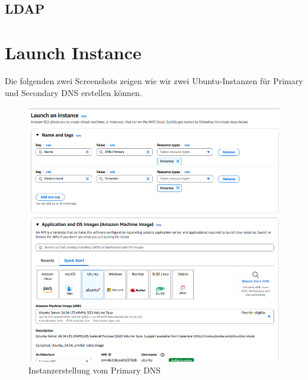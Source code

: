 \documentclass[a4paper,12pt]{article}
\begin{document}
\subsection{LDAP}
\begin{table}[H]
	\centering
	\caption{Security Group: LDAP}
	\label{tab:sec-Group-LDAP}
\end{table}


\section{Launch Instance}

Die folgenden zwei Screenshots zeigen wie wir zwei Ubuntu-Instanzen für Primary und Secondary DNS erstellen können.

\begin{figure}[H]
	\centering
	\includegraphics[width=\textwidth]{data/Launch_Instance_DNS_Primary.png}
	\caption{Instanzerstellung vom Primary DNS}
	\label{fig:Instanzecreation vom Primary DNS}
\end{figure}
\end{document}

